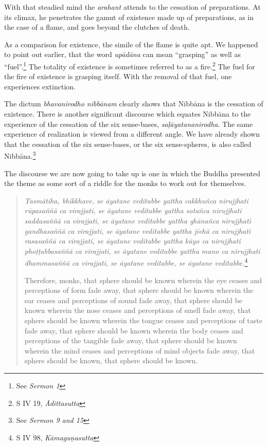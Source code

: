 With that steadied mind the \emph{arahant} attends to the cessation of preparations. At its climax, he penetrates the gamut of existence made up of preparations, as in the case of a flame, and goes beyond the clutches of death.

As a comparison for existence, the simile of the flame is quite apt. We happened to point out earlier, that the word \emph{upādāna} can mean ``grasping'' as well as ``fuel''.\footnote{See \emph{Sermon 1}} The totality of existence is sometimes referred to as a fire.\footnote{S IV 19, \emph{Ādittasutta}} The fuel for the fire of existence is grasping itself. With the removal of that fuel, one experiences extinction.

The dictum \emph{bhavanirodho nibbānam} clearly shows that Nibbāna is the cessation of existence. There is another significant discourse which equates Nibbāna to the experience of the cessation of the six sense-bases, \emph{saḷāyatananirodha}. The same experience of realization is viewed from a different angle. We have already shown that the cessation of the six sense-bases, or the six sense-spheres, is also called Nibbāna.\footnote{See \emph{Sermon 9 and 15}}

The discourse we are now going to take up is one in which the Buddha presented the theme as some sort of a riddle for the monks to work out for themselves.

\begin{quote}
\emph{Tasmātiha, bhikkhave, se āyatane veditabbe yattha cakkhuñca nirujjhati rūpasaññā ca virajjati, se āyatane veditabbe yattha sotañca nirujjhati saddasaññā ca virajjati, se āyatane veditabbe yattha ghānañca nirujjhati gandhasaññā ca virajjati, se āyatane veditabbe yattha jivhā ca nirujjhati rasasaññā ca virajjati, se āyatane veditabbe yattha kāyo ca nirujjhati phoṭṭabbasaññā ca virajjati, se āyatane veditabbe yattha mano ca nirujjhati dhammasaññā ca virajjati, se āyatane veditabbe, se āyatane veditabbe.}\footnote{S IV 98, \emph{Kāmaguṇasutta}}

Therefore, monks, that sphere should be known wherein the eye ceases and perceptions of form fade away, that sphere should be known wherein the ear ceases and perceptions of sound fade away, that sphere should be known wherein the nose ceases and perceptions of smell fade away, that sphere should be known wherein the tongue ceases and perceptions of taste fade away, that sphere should be known wherein the body ceases and perceptions of the tangible fade away, that sphere should be known wherein the mind ceases and perceptions of mind objects fade away, that sphere should be known, that sphere should be known.
\end{quote}

